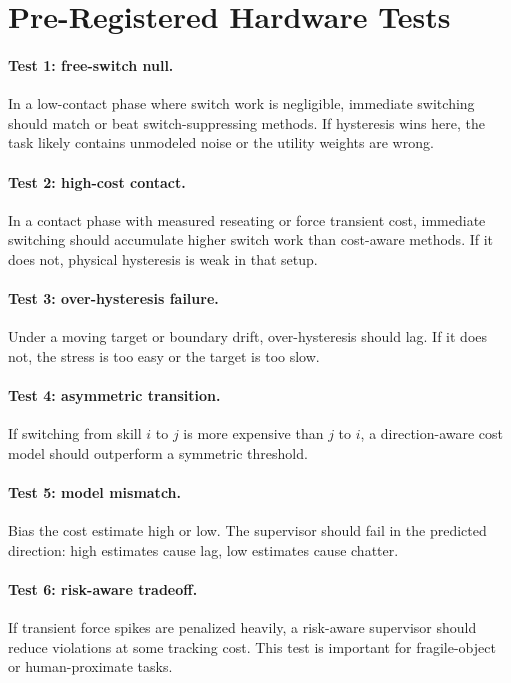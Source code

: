 \documentclass{article}
\begin{document}
\section{Pre-Registered Hardware Tests}

\paragraph{Test 1: free-switch null.}
In a low-contact phase where switch work is negligible, immediate switching should match or beat switch-suppressing methods.
If hysteresis wins here, the task likely contains unmodeled noise or the utility weights are wrong.

\paragraph{Test 2: high-cost contact.}
In a contact phase with measured reseating or force transient cost, immediate switching should accumulate higher switch work than cost-aware methods.
If it does not, physical hysteresis is weak in that setup.

\paragraph{Test 3: over-hysteresis failure.}
Under a moving target or boundary drift, over-hysteresis should lag.
If it does not, the stress is too easy or the target is too slow.

\paragraph{Test 4: asymmetric transition.}
If switching from skill $i$ to $j$ is more expensive than $j$ to $i$, a direction-aware cost model should outperform a symmetric threshold.

\paragraph{Test 5: model mismatch.}
Bias the cost estimate high or low.
The supervisor should fail in the predicted direction: high estimates cause lag, low estimates cause chatter.

\paragraph{Test 6: risk-aware tradeoff.}
If transient force spikes are penalized heavily, a risk-aware supervisor should reduce violations at some tracking cost.
This test is important for fragile-object or human-proximate tasks.
\end{document}
